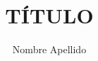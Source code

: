 \documentclass[letterpaper]{article} %
\author{Nombre Apellido}
\title{TÍTULO}
\begin{document}




\newpage

\nocite{*} 

\end{document}
